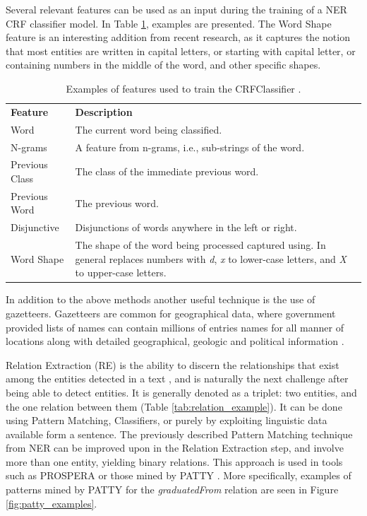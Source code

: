 \documentclass[11pt,a4paper,openright]{memoir}
\begin{document}
Several relevant features can be used as an input during the training of a NER CRF classifier model. In Table \ref{tab:ner_features}, examples are presented. The Word Shape feature is an interesting addition from recent research, as it captures the notion that most entities are written in capital letters, or starting with capital letter, or containing numbers in the middle of the word, and other specific shapes.

\begin{table}[!htbp]
  \centering
    \begin{tabular}{ll}
      \textbf{Feature}          & \textbf{Description} \\
      Word                      & The current word being classified.          \\
      N-grams                   & \parbox[t]{9cm}{A feature from n-grams, i.e., sub-strings of the word.} \\
      Previous Class            & The class of the immediate previous word.          \\
      Previous Word             & The previous word.          \\
      Disjunctive               & \parbox[t]{9cm}{Disjunctions of words anywhere in the left or right.} \\
      Word Shape                & \parbox[t]{9cm}{The shape of the word being processed captured using. In general replaces numbers with \emph{d}, \emph{x} to lower-case letters, and \emph{X} to upper-case letters.} \\
    \end{tabular}
  \caption[Possible features to train the CRFClassifier.]{Examples of features used to train the CRFClassifier \cite{Finkel:2005:INI:1219840.1219885}.}
  \label{tab:ner_features}
\end{table}

In addition to the above methods another useful technique is the use of gazetteers. Gazetteers are common for geographical data, where government provided lists of names can contain millions of entries names for all manner of locations along with detailed geographical, geologic and political information \cite{Jurafsky:2000:SLP:555733}.

Relation Extraction (RE) is the ability to discern the relationships that exist among the entities detected in a text \cite{Jurafsky:2000:SLP:555733}, and is naturally the next challenge after being able to detect entities. It is generally denoted as a triplet: two entities, and the one relation between them (Table \ref{tab:relation_example}). It can be done using Pattern Matching, Classifiers, or purely by exploiting linguistic data available form a sentence. The previously described Pattern Matching technique from NER can be improved upon in the Relation Extraction step, and involve more than one entity, yielding binary relations. This approach is used in tools such as PROSPERA \cite{Nakashole:2011:SKH:1935826.1935869} or those mined by PATTY \cite{Nakashole:2012:PTR:2390948.2391076}. More specifically, examples of patterns mined by PATTY for the \emph{graduatedFrom} relation are seen in Figure \ref{fig:patty_examples}.
\end{document}

